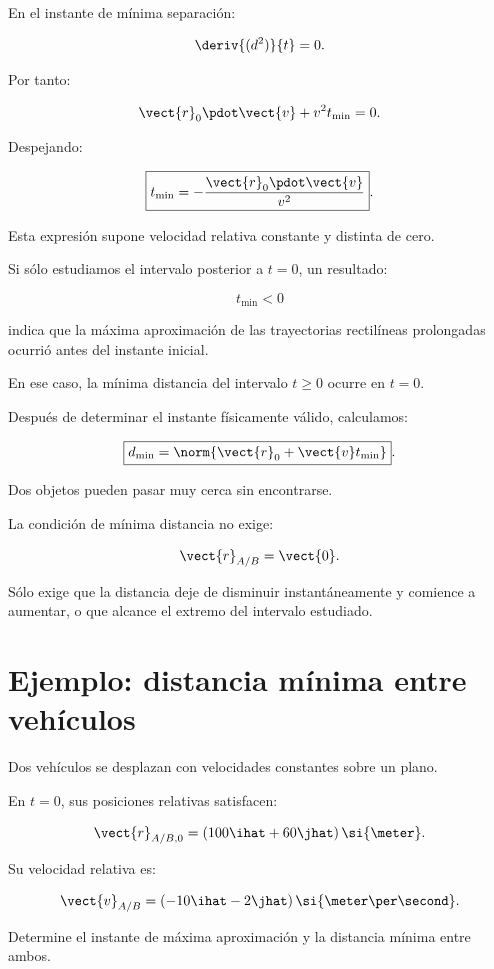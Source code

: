 En el instante de mínima separación:

\[
\deriv{(d^2)}{t}=0.
\]

Por tanto:

\[
\vect{r}_0\pdot\vect{v}
+
v^2t_{\min}=0.
\]

Despejando:

\[
\boxed{
t_{\min}
=
-\frac{
\vect{r}_0\pdot\vect{v}
}{
v^2
}
}.
\]

\begin{condicion}

Esta expresión supone velocidad relativa constante
y distinta de cero.

Si sólo estudiamos el intervalo posterior
a \(t=0\), un resultado:

\[
t_{\min}<0
\]

indica que la máxima aproximación de
las trayectorias rectilíneas prolongadas
ocurrió antes del instante inicial.

En ese caso, la mínima distancia del intervalo
\(t\geq0\) ocurre en \(t=0\).

\end{condicion}

Después de determinar el instante físicamente
válido, calculamos:

\[
\boxed{
d_{\min}
=
\norm{\vect{r}_0+\vect{v}t_{\min}}
}.
\]

\begin{interpretacion}

Dos objetos pueden pasar muy cerca sin encontrarse.

La condición de mínima distancia no exige:

\[
\vect{r}_{A/B}=\vect{0}.
\]

Sólo exige que la distancia deje de disminuir
instantáneamente y comience a aumentar,
o que alcance el extremo del intervalo estudiado.

\end{interpretacion}


\section{Ejemplo: distancia mínima entre vehículos}

\begin{ejemplo}

Dos vehículos se desplazan con velocidades constantes
sobre un plano.

En \(t=0\), sus posiciones relativas satisfacen:

\[
\vect{r}_{A/B,0}
=
(100\ihat+60\jhat)\,\si{\meter}.
\]

Su velocidad relativa es:

\[
\vect{v}_{A/B}
=
(-10\ihat-2\jhat)\,
\si{\meter\per\second}.
\]

Determine el instante de máxima aproximación
y la distancia mínima entre ambos.

\end{ejemplo}

